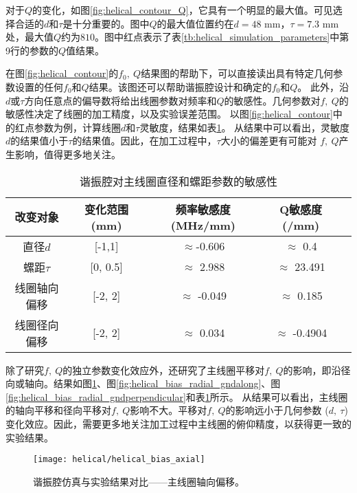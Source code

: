 对于$Q$的变化，如图\ref{fig:helical_contour_Q}，它具有一个明显的最大值。可见选择合适的$d$和$\tau$是十分重要的。图中$Q$的最大值位置约在$d=48$ mm，$\tau=7.3$ mm处，最大值$Q$约为$810$。图中红点表示了表\ref{tb:helical_simulation_parameters}中第9行的参数的$Q$值结果。

在图\ref{fig:helical_contour}的$ f_0,\ Q $结果图的帮助下，可以直接读出具有特定几何参数设置的任何$f_0$和$Q$结果。该图还可以帮助谐振腔设计和确定的$f_0$和$Q$。
此外，沿$d$或$\tau$方向任意点的偏导数将给出线圈参数对频率和$Q$的敏感性。几何参数对$f,\ Q$的敏感性决定了线圈的加工精度，以及实验误差范围。
以图\ref{fig:helical_contour}中的红点参数为例，计算线圈$d$和$\tau$灵敏度，结果如表\ref{tb:helical_d_tau_sensitivity}。
从结果中可以看出，灵敏度$d$的结果值小于$\tau$的结果值。因此，在加工过程中，$\tau$大小的偏差更有可能对 $f,\ Q$产生影响，值得更多地关注。

\begin{table}
    \centering
    \caption[谐振腔对主线圈直径和螺距参数的敏感性]{谐振腔对主线圈直径和螺距参数的敏感性\label{tb:helical_d_tau_sensitivity}}
    \begin{tabular}{ccccc}
        \toprule
        改变对象 & 变化范围 (mm) & 频率敏感度(MHz/mm) & Q敏感度(/mm) \\
        \midrule
        直径$d$  & [-1,1] & $\approx$-0.606 & $\approx$ 0.4\\
        螺距$\tau$  & [0, 0.5] & $\approx$ 2.988 & $\approx$ 23.491 \\
        线圈轴向偏移 & [-2, 2] & $\approx$ -0.049 & $\approx$ 0.185\\
        线圈径向偏移 & [-2, 2] & $\approx$ 0.034 & $\approx$ -0.4904\\
        \bottomrule
    \end{tabular}
\end{table}

除了研究$f,\ Q$的独立参数变化效应外，还研究了主线圈平移对$f,\ Q$的影响，即沿径向或轴向。结果如图\ref{fig:helical_bias_axial}、图\ref{fig:helical_bias_radial_gndalong}、图\ref{fig:helical_bias_radial_gndperpendicular}和表\ref{tb:helical_d_tau_sensitivity}所示。
从结果可以看出，主线圈的轴向平移和径向平移对$f,\ Q$影响不大。平移对$f,\ Q$的影响远小于几何参数 ($d,\ \tau$) 变化效应。因此，需要更多地关注加工过程中主线圈的俯仰精度，以获得更一致的实验结果。

\begin{figure}
    \centering
    \texttt{[image: helical/helical\_bias\_axial]}
    \caption[谐振腔仿真与实验结果对比——主线圈轴向偏移]{谐振腔仿真与实验结果对比——主线圈轴向偏移。\label{fig:helical_bias_axial}}
\end{figure}

